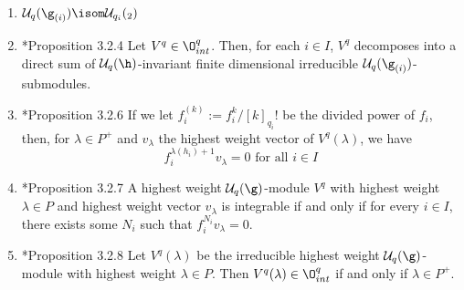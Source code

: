 \documentclass[11pt,leqno,oneside]{amsart}
\numberwithin{thm}{section}
\newcommand{\weightlattice}{P}
\newcommand{\U}{\mathcal{U}}
\begin{document}
\begin{prop}
  \begin{enumerate}
  \item \(\U_q(\g_{(i)}) \isom \U_{q_i}(\sl_2)\)
  \item \cite{hong-kang}*{Proposition 3.2.4} Let \(V^q \in
    \O^q_{int}\). Then, for each \(i \in I\), 
    \(V^q\) decomposes into a direct sum of \(\U_q(\h)\)-invariant
    finite dimensional irreducible \(\U_q(\g_{(i)})\)-submodules.
  \item \cite{hong-kang}*{Proposition 3.2.6} If we let \(f_i^{(k)} := f_i^k/[k]_{q_i}!\) be the divided
    power of \(f_i\), then, for \(\lambda \in \weightlattice^+\) and
    \(v_\lambda\) the highest weight vector of \(V^q(\lambda)\), we
    have \[
      f_i^{\lambda(h_i)+1} v_\lambda = 0 \text{ for all }i \in I
    \]
  \item \cite{hong-kang}*{Proposition 3.2.7} A highest weight
    \(\U_q(\g)\)-module \(V^q\) with highest weight \(\lambda \in
    \weightlattice\) and highest weight vector \(v_\lambda\) is
    integrable if and only if for every \(i \in I\), there exists some
    \(N_i\) such that \(f_i^{N_i}v_\lambda = 0\).
  \item \cite{hong-kang}*{Proposition 3.2.8} Let \(V^q(\lambda)\) be
    the irreducible highest weight 
    \(\U_q(\g)\)-module with highest weight \(\lambda \in
    \weightlattice\). Then \(V^q(\lambda) \in \O^q_{int}\) if and only
    if \(\lambda \in \weightlattice^+\).
  \end{enumerate}
\end{prop}
\end{document}
